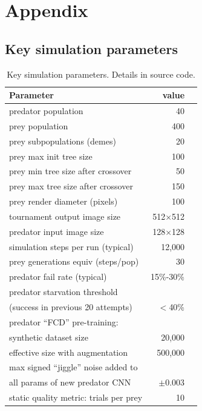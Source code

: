\documentclass[letterpaper]{article}
\begin{document}
\section{Appendix}

\subsection{Key simulation parameters}

\begin{footnotesize}
\begin{table}[h]
    \centering
    \vspace{0.7cm}

    \begin{tabular}{ |l|r|r| }
        \hline
        \textbf{Parameter} & \textbf{value} \\ 
        \hline
        predator population & 40 \\ 
        prey population & 400 \\ 
        prey subpopulations (demes) & 20 \\
        prey max init tree size & 100 \\
        prey min tree size after crossover & 50 \\
        prey max tree size after crossover & 150 \\
        \hline
        prey render diameter (pixels) & 100 \\ 
        tournament output image size & 512$\times$512 \\ 
        predator input image size & 128$\times$128 \\ 
        \hline
        simulation steps per run (typical) & 12,000 \\
        prey generations equiv (steps/pop) & 30 \\
        predator fail rate (typical) & 15\%-30\% \\
        predator starvation threshold & \\
        \hspace{0.2cm}(success in previous 20 attempts) & $<$40\% \\ 
        \hline
        predator “FCD” pre-training: & \\
        \hspace{0.2cm} synthetic dataset size & 20,000 \\
        \hspace{0.2cm} effective size with augmentation & 500,000 \\
        \hline
        max signed “jiggle” noise added to  & \\
        \hspace{0.2cm} all params of new predator CNN & $\pm$0.003 \\
        \hline
        static quality metric: trials per prey & 10\\
        \hline
    \end{tabular}
    \caption{Key simulation parameters. Details in source code.}
    \label{table:key_simulation_parameters} 
\end{table}
\end{footnotesize}
\end{document}
